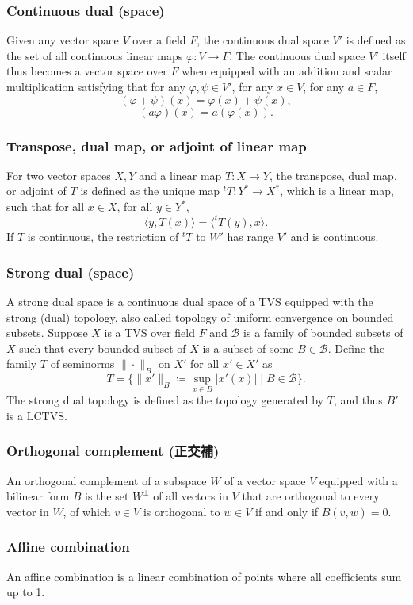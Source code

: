 \documentclass[a4paper,12pt]{report}
\begin{document}
\subsubsection{Continuous dual (space)}
Given any vector space $V$ over a field $F$, the continuous dual space $V'$ is defined as the set of all continuous linear maps $\varphi\colon V\to F$. The continuous dual space $V'$ itself thus becomes a vector space over $F$ when equipped with an addition and scalar multiplication satisfying that for any $\varphi ,\psi \in V'$, for any $x\in V$, for any $a\in F$,
\[(\varphi+\psi)(x)=\varphi (x)+\psi (x),\]
\[(a\varphi )(x)=a\left(\varphi (x)\right).\]
\subsubsection{Transpose, dual map, or adjoint of linear map}
For two vector spaces $X,Y$ and a linear map $T\colon X\to Y$, the transpose, dual map, or adjoint of $T$ is defined as the unique map $^tT\colon Y^*\to X^*$, which is a linear map, such that for all $x\in X$, for all $y\in Y^*$,
\[\langle y,T(x)\rangle=\langle^tT(y),x\rangle.\]
If $T$ is continuous, the restriction of $^tT$ to $W'$ has range $V'$ and is continuous.
\subsubsection{Strong dual (space)}
A strong dual space is a continuous dual space of a TVS equipped with the strong (dual) topology, also called topology of uniform convergence on bounded subsets. Suppose $X$ is a TVS over field $F$ and $\mathcal{B}$ is a family of bounded subsets of $X$ such that every bounded subset of $X$ is a subset of some $B\in\mathcal{B}$. Define the family $T$ of seminorms $\|\cdot\|_B$ on $X'$ for all $x'\in X'$ as
\[T=\{\|x'\|_B\coloneq\sup_{x\in B}|x'(x)|\mid B\in\mathcal{B}\}.\]
The strong dual topology is defined as the topology generated by $T$, and thus $B'$ is a LCTVS.
\subsubsection{Orthogonal complement (正交補)}
An orthogonal complement of a subspace $W$ of a vector space $V$ equipped with a bilinear form $B$ is the set $W^{\perp }$ of all vectors in $V$ that are orthogonal to every vector in $W$, of which $v\in V$ is orthogonal to $w\in V$ if and only if $B(v,w)=0$.
\subsubsection{Affine combination}
An affine combination is a linear combination of points where all coefficients sum up to 1.
\end{document}
